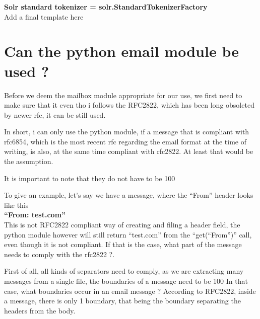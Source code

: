 \documentclass{report}
\begin{document}
\textbf{Solr standard tokenizer = solr.StandardTokenizerFactory}\\

Add a final template here\\

\section{Can the python email module be used ?}

Before we deem the mailbox module appropriate for our use, we first need to make sure that it even tho i follows the RFC2822, which has been long obsoleted by newer rfc, it can be still used.

In short, i can only use the python module, if a message that is compliant with rfc6854, which is the most recent rfc regarding the email format at the time of writing, is also, at the same time compliant with rfc2822. At least that would be the assumption.

It is important to note that they do not have to be 100%

To give an example, let's say we have a message, where the “From” header looks like this\\

\textbf{“From: test.com”}\\

This is not RFC2822 compliant way of creating and filing a header field, the python module however will still return “test.com” from the “get(“From”)” call, even though it is not compliant.
If that is the case, what part of the message needs to comply with the rfc2822 ?.

First of all, all kinds of separators need to comply, as we are extracting many messages from a single  file, the boundaries of a message need to be 100%
In that case, what boundaries occur in an email message ?
According to RFC2822, inside a message, there is only 1 boundary, that being the boundary separating the headers from the body.\\\\
\end{document}
